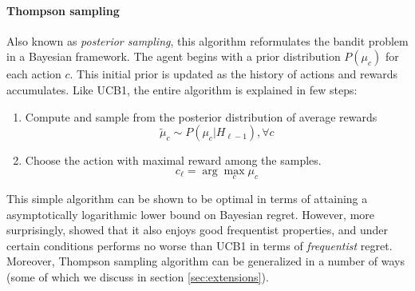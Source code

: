 \begin{itemize}
\paragraph{Thompson sampling} Also known as \emph{posterior sampling}, this algorithm reformulates the bandit problem in a Bayesian framework. The agent begins with a prior distribution $P(\mu_c)$ for each action $c$. This initial prior is updated as the history of actions and rewards accumulates. Like UCB1, the entire algorithm is explained in few steps:
\begin{enumerate}
  \item Compute and sample from the posterior distribution of average rewards 
  $$\tilde{\mu}_c \sim P(\mu_c | H_{\ell-1}), \forall c$$
  \item Choose the action with maximal reward among the samples.
  $$c_{\ell} = \arg\max_c \mu_c$$
\end{enumerate}

This simple algorithm can be shown to be optimal in terms of attaining a asymptotically logarithmic lower bound on Bayesian regret\cite{slivkins2018introduction}. However, more surprisingly, \cite{kaufmann2012thompson} showed that it also enjoys good frequentist properties, and under certain conditions performs no worse than UCB1 in terms of \emph{frequentist} regret. Moreover, Thompson sampling algorithm can be generalized in a number of ways (some of which we discuss in section \ref{sec:extensions}). 


\begin{algorithm}[htbp]
 \SetAlgoLined
  \DontPrintSemicolon
\end{algorithm}
\end{itemize}
